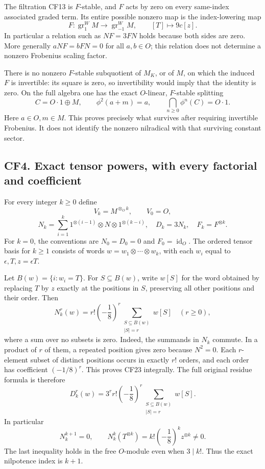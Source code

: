 The filtration CF13 is \(F\)-stable, and \(F\) acts by zero on every same-index associated graded term. Its entire possible nonzero map is the index-lowering map
\[
 F:\operatorname{gr}^W_1M\longrightarrow\operatorname{gr}^W_{-1}M,
 \qquad [T]\longmapsto 9c[z].
 \tag{CF20}
\]
In particular a relation such as \(NF=3FN\) holds because both sides are zero. More generally \(aNF=bFN=0\) for all \(a,b\in O\); this relation does not determine a nonzero Frobenius scaling factor.

There is no nonzero \(F\)-stable subquotient of \(M_K\), or of \(M\), on which the induced \(F\) is invertible: its square is zero, so invertibility would imply that the identity is zero. On the full algebra one has the exact \(O\)-linear, \(F\)-stable splitting
\[
 C=O\cdot1\oplus M,
 \qquad \phi^2(a+m)=a,
 \qquad \bigcap_{n\geq0}\phi^n(C)=O\cdot1.
 \tag{CF21}
\]
Here \(a\in O,m\in M\). This proves precisely what survives after requiring invertible Frobenius. It does not identify the nonzero nilradical with that surviving constant sector.

\subsection{CF4. Exact tensor powers, with every factorial and coefficient}\label{cf4.-exact-tensor-powers-with-every-factorial-and-coefficient}

For every integer \(k\geq0\) define
\[
 V_k=M^{\otimes_O k},\qquad V_0=O,
\]
\[
 N_k=\sum_{i=1}^k
 1^{\otimes(i-1)}\otimes N\otimes1^{\otimes(k-i)},
 \quad D_k=3N_k,
 \quad F_k=F^{\otimes k}.
 \tag{CF22}
\]
For \(k=0\), the conventions are \(N_0=D_0=0\) and \(F_0=\operatorname{id}_O\). The ordered tensor basis for \(k\geq1\) consists of words \(w=w_1\otimes\cdots\otimes w_k\), with each \(w_i\) equal to \(\epsilon,T,z=\epsilon T\).

Let \(B(w)=\{i:w_i=T\}\). For \(S\subseteq B(w)\), write \(w[S]\) for the word obtained by replacing \(T\) by \(z\) exactly at the positions in \(S\), preserving all other positions and their order. Then
\[
 \boxed{N_k^r(w)=r!\left(-\frac18\right)^r
 \sum_{\substack{S\subseteq B(w)\\|S|=r}}w[S]}
 \quad(r\geq0),
 \tag{CF23}
\]
where a sum over no subsets is zero. Indeed, the summands in \(N_k\) commute. In a product of \(r\) of them, a repeated position gives zero because \(N^2=0\). Each \(r\)-element subset of distinct positions occurs in exactly \(r!\) orders, and each order has coefficient \((-1/8)^r\). This proves CF23 integrally. The full original residue formula is therefore
\[
 \boxed{D_k^r(w)=3^r r!\left(-\frac18\right)^r
 \sum_{\substack{S\subseteq B(w)\\|S|=r}}w[S].}
 \tag{CF24}
\]
In particular
\[
 N_k^{k+1}=0,\qquad
 N_k^k(T^{\otimes k})=k!\left(-\frac18\right)^kz^{\otimes k}\neq0.
 \tag{CF25}
\]
The last inequality holds in the free \(O\)-module even when \(3\mid k!\). Thus the exact nilpotence index is \(k+1\).

